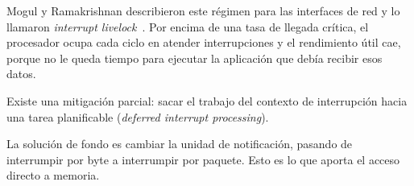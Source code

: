 Mogul y Ramakrishnan describieron este régimen para las interfaces de red y lo llamaron
\textit{interrupt livelock}~\cite{mogul1997livelock}. Por encima de una tasa de llegada crítica,
el procesador ocupa cada ciclo en atender interrupciones y el rendimiento útil cae, porque no le
queda tiempo para ejecutar la aplicación que debía recibir esos datos.

Existe una mitigación parcial: sacar el trabajo del contexto de interrupción hacia una tarea
planificable (\textit{deferred interrupt processing}).

La solución de fondo es cambiar la unidad de notificación, pasando de interrumpir por byte a
interrumpir por paquete. Esto es lo que aporta el acceso directo a memoria.


